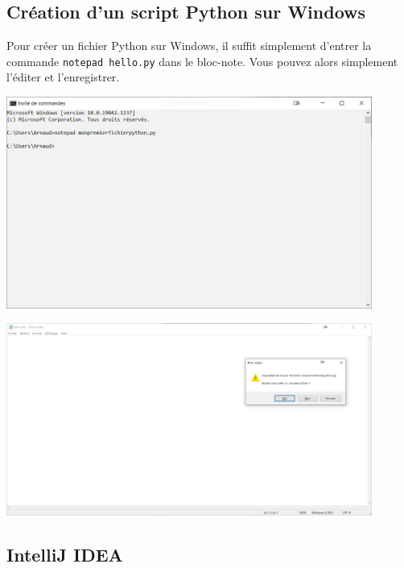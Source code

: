 \subsection{Création d'un script Python sur Windows}

Pour créer un fichier Python sur Windows, il suffit simplement d'entrer la commande \lstinline{notepad hello.py} dans le bloc-note. Vous pouvez alors simplement l'éditer et l'enregistrer.

\begin{center}
	\includegraphics[width=12cm]{4}	
\end{center}

\begin{center}
	\includegraphics[width=12cm]{5}	
\end{center}

\subsection{IntelliJ IDEA}

